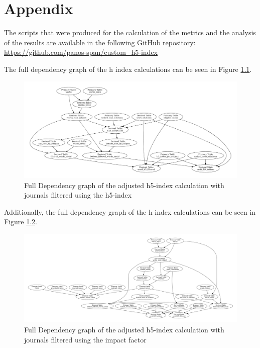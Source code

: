 \chapter{Appendix}
\label{ch:appendix}

The scripts that were produced for the calculation of the metrics and the
analysis of the results are available in the following GitHub repository:
\url{
    https://github.com/panos-span/custom_h5-index
}

The full dependency graph of the h index calculations can be seen
in Figure \ref{fig:dependency_graph_h5}.

\begin{figure}[H]
    \centering
    \includegraphics[width=\textwidth]{../figs/full-graph_h5.pdf}
    \caption{Full Dependency graph of the adjusted h5-index calculation with journals filtered using the h5-index}
    \label{fig:dependency_graph_h5}
\end{figure}

Additionally, the full dependency graph of the h index calculations can be seen
in Figure \ref{fig:dependency_graph_jif}.

\begin{figure}[H]
    \centering
    \includegraphics[width=\textwidth]{../figs/full-graph_jif.pdf}
    \caption{Full Dependency graph of the adjusted h5-index calculation with journals filtered using the impact factor}
    \label{fig:dependency_graph_jif}
\end{figure}